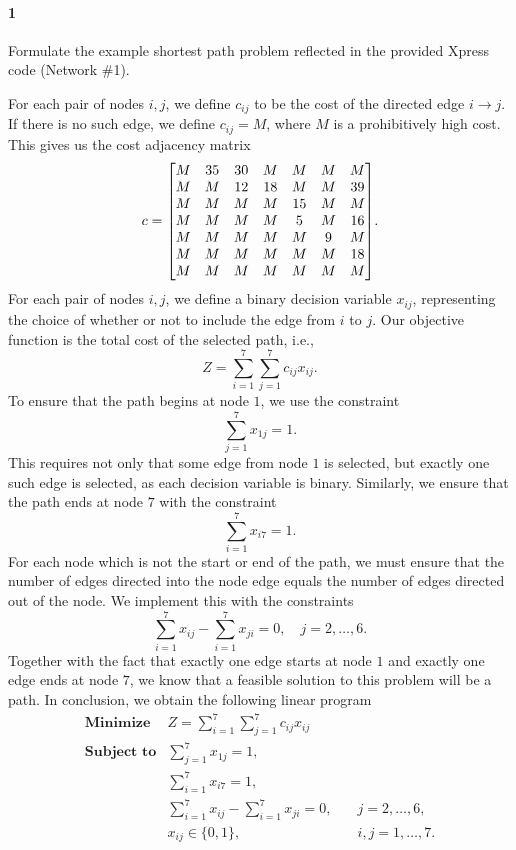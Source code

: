 \documentclass[12pt]{article}
\newenvironment{fullbox}{\begin{lrbox}{\savefullbox}\begin{minipage}{\dimexpr\textwidth-2\fboxsep\relax}}{\end{minipage}\end{lrbox}\begin{center}\framebox[\textwidth]{\usebox{\savefullbox}}\end{center}}
\newenvironment{pbox}[1][]{\begin{fullbox}\ifx#1\empty\else\paragraph{#1}\fi}{\end{fullbox}}
\theoremstyle{definition}
\newcommand{\tsum}{\textstyle\sum\limits}
\begin{document}
\thispagestyle{title}



\begin{pbox}[1]
    Formulate the example shortest path problem reflected in the provided Xpress code (Network \#1).
\end{pbox}

For each pair of nodes $i, j$, we define $c_{ij}$ to be the cost of the directed edge $i \to j$. If there is no such edge, we define $c_{ij} = M$, where $M$ is a prohibitively high cost. This gives us the cost adjacency matrix
\[
    c = \mqty[
        M & 35 & 30 & M & M & M & M \\
        M & M & 12 & 18 & M & M & 39 \\
        M & M & M & M & 15 & M & M \\
        M & M & M & M & 5 & M & 16 \\
        M & M & M & M & M & 9 & M \\
        M & M & M & M & M & M & 18 \\
        M & M & M & M & M & M & M
    ].
\]
For each pair of nodes $i, j$, we define a binary decision variable $x_{ij}$, representing the choice of whether or not to include the edge from $i$ to $j$. Our objective function is the total cost of the selected path, i.e.,
\[
    Z = \tsum_{i=1}^{7} \tsum_{j=1}^{7} c_{ij}x_{ij}.
\]
To ensure that the path begins at node $1$, we use the constraint
\[
    \tsum_{j=1}^{7} x_{1j} = 1.
\]
This requires not only that some edge from node $1$ is selected, but exactly one such edge is selected, as each decision variable is binary. Similarly, we ensure that the path ends at node $7$ with the constraint
\[
    \tsum_{i=1}^{7} x_{i7} = 1.
\]
For each node which is not the start or end of the path, we must ensure that the number of edges directed into the node edge equals the number of edges directed out of the node. We implement this with the constraints
\[
    \tsum_{i=1}^{7} x_{ij} - \tsum_{i=1}^{7} x_{ji} = 0, \quad j = 2,\dots, 6.
\]
Together with the fact that exactly one edge starts at node $1$ and exactly one edge ends at node $7$, we know that a feasible solution to this problem will be a path. In conclusion, we obtain the following linear program
\[\begin{array}{lll}
    \textbf{Minimize} & Z = \tsum_{i=1}^{7} \tsum_{j=1}^{7} c_{ij}x_{ij} \\
    \textbf{Subject to} & \tsum_{j=1}^{7} x_{1j} = 1, \\
        & \tsum_{i=1}^{7} x_{i7} = 1, \\
        & \tsum_{i=1}^{7} x_{ij} - \tsum_{i=1}^{7} x_{ji} = 0, \quad &j = 2,\dots, 6, \\
        & x_{ij} \in \{0, 1\}, \quad &i, j = 1, \dots, 7.
\end{array}\]
\end{document}
